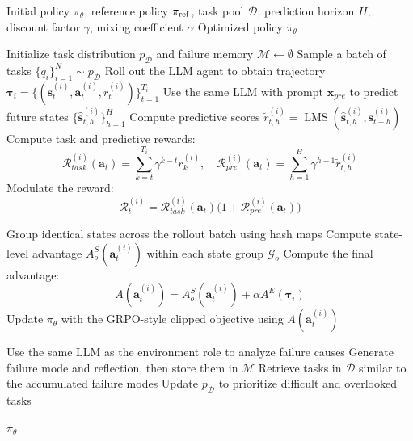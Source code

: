 \documentclass[11pt]{article}
\begin{document}
\begin{algorithm*}[t]
\caption{Role-Agent Training}
\label{alg:role-agent}
\begin{algorithmic}[1]
\Require Initial policy $\pi_\theta$, reference policy $\pi_{\rm ref}$, task pool $\mathcal{D}$, prediction horizon $H$, discount factor $\gamma$, mixing coefficient $\alpha$
\Ensure Optimized policy $\pi_\theta$

\State Initialize task distribution $p_{\mathcal{D}}$ and failure memory $\mathcal{M}\leftarrow\emptyset$
    \State Sample a batch of tasks $\{q_i\}_{i=1}^{N}\sim p_{\mathcal{D}}$
        \State Roll out the LLM agent to obtain trajectory
        $\bm{\tau}_i=\{(\bm{s}^{(i)}_t,\bm{a}^{(i)}_t,r^{(i)}_t)\}_{t=1}^{T_i}$
            \State Use the same LLM with prompt $\bm{x}_{pre}$ to predict future states
            $\{\hat{\bm{s}}^{(i)}_{t,h}\}_{h=1}^{H}$
            \State Compute predictive scores
            $\tilde{r}^{(i)}_{t,h}=\operatorname{LMS}(\hat{\bm{s}}^{(i)}_{t,h},\bm{s}^{(i)}_{t+h})$
            \State Compute task and predictive rewards:
            \[
            \mathcal{R}_{task}^{(i)}(\bm{a}_t)=\sum_{k=t}^{T_i}\gamma^{k-t}r^{(i)}_k,\quad
            \mathcal{R}_{pre}^{(i)}(\bm{a}_t)=\sum_{h=1}^{H}\gamma^{h-1}\tilde{r}^{(i)}_{t,h}
            \]
            \State Modulate the reward:
            \[
            \mathcal{R}^{(i)}_t=
            \mathcal{R}_{task}^{(i)}(\bm{a}_t)
            \bigl(1+\mathcal{R}_{pre}^{(i)}(\bm{a}_t)\bigr)
            \]
        \EndFor
    \EndFor

    \State Group identical states across the rollout batch using hash maps
    \State Compute state-level advantage $A^S_o(\bm{a}^{(i)}_t)$ within each state group $\mathcal{G}_o$
    \State Compute the final advantage:
    \[
    A(\bm{a}^{(i)}_t)=A^S_o(\bm{a}^{(i)}_t)+\alpha A^E(\bm{\tau}_i)
    \]
    \State Update $\pi_\theta$ with the GRPO-style clipped objective using $A(\bm{a}^{(i)}_t)$

        \State Use the same LLM as the environment role to analyze failure causes
        \State Generate failure mode and reflection, then store them in $\mathcal{M}$
    \EndFor
    \State Retrieve tasks in $\mathcal{D}$ similar to the accumulated failure modes
    \State Update $p_{\mathcal{D}}$ to prioritize difficult and overlooked tasks
\EndFor

\State \Return $\pi_\theta$
\end{algorithmic}
\end{algorithm*}
\end{document}
